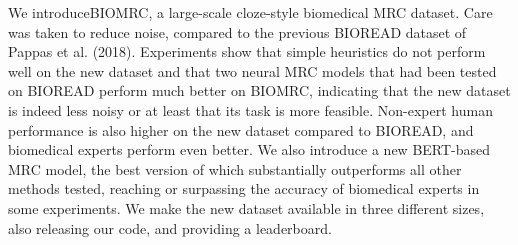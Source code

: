 We introduceBIOMRC, a large-scale cloze-style biomedical MRC dataset. Care was taken to reduce noise, compared to the previous BIOREAD dataset of Pappas et al. (2018). Experiments show that simple heuristics do not perform well on the new dataset and that two neural MRC models that had been tested on BIOREAD perform much better on BIOMRC, indicating that the new dataset is indeed less noisy or at least that its task is more feasible. Non-expert human performance is also higher on the new dataset compared to BIOREAD, and biomedical experts perform even better. We also introduce a new BERT-based MRC model, the best version of which substantially outperforms all other methods tested, reaching or surpassing the accuracy of biomedical experts in some experiments. We make the new dataset available in three different sizes, also releasing our code, and providing a leaderboard.
